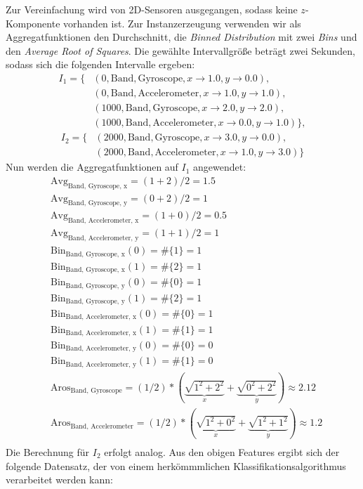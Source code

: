 Zur Vereinfachung wird von 2D-Sensoren ausgegangen, sodass keine $z$-Komponente vorhanden ist. Zur Instanzerzeugung verwenden wir als Aggregatfunktionen den Durchschnitt, die \textit{Binned Distribution} mit zwei \textit{Bins} und den \textit{Average Root of Squares}. Die gewählte Intervallgröße beträgt zwei Sekunden, sodass sich die folgenden Intervalle ergeben:
\begin{align*}
I_1 = \{&(0, \text{Band}, \text{Gyroscope}, {x \to 1.0, y \to 0.0}), \\
&(0, \text{Band}, \text{Accelerometer}, {x \to 1.0, y \to 1.0}), \\
&(1000, \text{Band}, \text{Gyroscope}, {x \to 2.0, y \to 2.0}), \\
&(1000, \text{Band}, \text{Accelerometer}, {x \to 0.0, y \to 1.0})\},
\end{align*}
\begin{align*}
I_2 = \{&(2000, \text{Band}, \text{Gyroscope}, {x \to 3.0, y \to 0.0}), \\
&(2000, \text{Band}, \text{Accelerometer}, {x \to 1.0, y \to 3.0})\}
\end{align*}
Nun werden die Aggregatfunktionen auf $I_1$ angewendet:
\begin{align*}
&\text{Avg}_\text{Band, Gyroscope, x} = (1 + 2)/2 = 1.5 \\
&\text{Avg}_\text{Band, Gyroscope, y} = (0 + 2)/2 = 1 \\
&\text{Avg}_\text{Band, Accelerometer, x} = (1 + 0)/2 = 0.5 \\
&\text{Avg}_\text{Band, Accelerometer, y} = (1 + 1)/2 = 1 \\
&\text{Bin}_\text{Band, Gyroscope, x}(0) = \#\{1\} = 1 \\
&\text{Bin}_\text{Band, Gyroscope, x}(1) = \#\{2\} = 1 \\
&\text{Bin}_\text{Band, Gyroscope, y}(0) = \#\{0\} = 1 \\
&\text{Bin}_\text{Band, Gyroscope, y}(1) = \#\{2\} = 1 \\
&\text{Bin}_\text{Band, Accelerometer, x}(0) = \#\{0\} = 1 \\
&\text{Bin}_\text{Band, Accelerometer, x}(1) = \#\{1\} = 1 \\
&\text{Bin}_\text{Band, Accelerometer, y}(0) = \#\{0\} = 0 \\
&\text{Bin}_\text{Band, Accelerometer, y}(1) = \#\{1\} = 0 \\
&\text{Aros}_\text{Band, Gyroscope} = (1/2) * (\underbrace{\sqrt{1^2 + 2^2}}_x + \underbrace{\sqrt{0^2 + 2^2}}_y) \approx 2.12 \\
&\text{Aros}_\text{Band, Accelerometer} = (1/2) * (\underbrace{\sqrt{1^2 + 0^2}}_x + \underbrace{\sqrt{1^2 + 1^2}}_y) \approx 1.2 \\
\end{align*}
Die Berechnung für $I_2$ erfolgt analog. Aus den obigen Features ergibt sich der folgende Datensatz, der von einem herkömmmlichen Klassifikationsalgorithmus verarbeitet werden kann:\\

